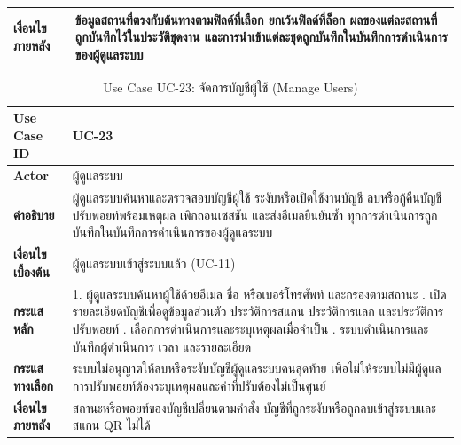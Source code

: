 \begin{longtable}{|p{3.2cm}|p{10cm}|}
\textbf{เงื่อนไขภายหลัง} & ข้อมูลสถานที่ตรงกับต้นทางตามฟิลด์ที่เลือก ยกเว้นฟิลด์ที่ล็อก ผลของแต่ละสถานที่ถูกบันทึกไว้ในประวัติชุดงาน และการนำเข้าแต่ละชุดถูกบันทึกในบันทึกการดำเนินการของผู้ดูแลระบบ \\
\hline
\end{longtable}

\begin{table}[H]
\centering
\caption{Use Case UC-23: จัดการบัญชีผู้ใช้ (Manage Users)}
\label{tab:uc23}
\begin{tabular}{|p{3.2cm}|p{10cm}|}
\hline
\textbf{Use Case ID} & UC-23 \\ \hline
\textbf{Actor} & ผู้ดูแลระบบ \\ \hline
\textbf{คำอธิบาย} & ผู้ดูแลระบบค้นหาและตรวจสอบบัญชีผู้ใช้ ระงับหรือเปิดใช้งานบัญชี ลบหรือกู้คืนบัญชี ปรับพอยท์พร้อมเหตุผล เพิกถอนเซสชัน และส่งอีเมลยืนยันซ้ำ ทุกการดำเนินการถูกบันทึกในบันทึกการดำเนินการของผู้ดูแลระบบ \\ \hline
\textbf{เงื่อนไขเบื้องต้น} & ผู้ดูแลระบบเข้าสู่ระบบแล้ว (UC-11) \\ \hline
\textbf{กระแสหลัก} & 1. ผู้ดูแลระบบค้นหาผู้ใช้ด้วยอีเมล ชื่อ หรือเบอร์โทรศัพท์ และกรองตามสถานะ \newline 2. เปิดรายละเอียดบัญชีเพื่อดูข้อมูลส่วนตัว ประวัติการสแกน ประวัติการแลก และประวัติการปรับพอยท์ \newline 3. เลือกการดำเนินการและระบุเหตุผลเมื่อจำเป็น \newline 4. ระบบดำเนินการและบันทึกผู้ดำเนินการ เวลา และรายละเอียด \\ \hline
\textbf{กระแสทางเลือก} & ระบบไม่อนุญาตให้ลบหรือระงับบัญชีผู้ดูแลระบบคนสุดท้าย เพื่อไม่ให้ระบบไม่มีผู้ดูแล \newline การปรับพอยท์ต้องระบุเหตุผลและค่าที่ปรับต้องไม่เป็นศูนย์ \\ \hline
\textbf{เงื่อนไขภายหลัง} & สถานะหรือพอยท์ของบัญชีเปลี่ยนตามคำสั่ง บัญชีที่ถูกระงับหรือถูกลบเข้าสู่ระบบและสแกน QR ไม่ได้ \\
\hline
\end{tabular}
\end{table}


